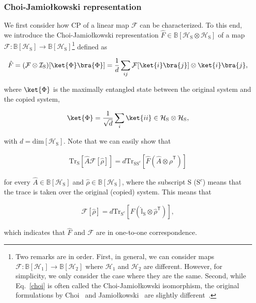 \documentclass[preprint,pteplogo]{ptephy_v2}%
\numberwithin{equation}{section}
\theoremstyle{definition}
\newcommand{\ml}[1]{\mathcal{#1}}
\newcommand{\mr}[1]{\mathrm{#1}}
\newcommand{\mbb}[1]{\mathbb{#1}}
\newcommand{\aln}[1]{
\begin{align}
#1
\end{align}
}
\newcommand{\ra}{\rightarrow}
\newcommand{\Tr}{\mr{Tr}}
\begin{document}
\subsubsection{Choi-Jamiołkowski representation}
We first consider how CP of a linear map $\ml{F}$ can be characterized.
To this end, we introduce the Choi-Jamiołkowski representation $\hat{F}\in\mbb{B}[\ml{H}_\mr{S}\otimes \ml{H}_\mr{S}]$ of a map $\ml{F}: \mbb{B}[\ml{H}_\mr{S}]\ra \mbb{B}[\ml{H}_\mr{S}]$\footnote{
Two remarks are in order. 
First, in general, we can consider maps $\ml{F}: \mbb{B}[\ml{H}_1]\ra \mbb{B}[\ml{H}_2]$ where $\ml{H}_1$ and $\ml{H}_2$ are different. 
However, for simplicity, we only consider the case where they are the same.
Second, while Eq.~\eqref{choi} is often called the Choi-Jamiołkowski isomorphism, the original formulations by Choi~\cite{choi1975completely} and Jamiołkowski~\cite{jamiolkowski1972linear} are slightly different~\cite{jiang2013channel}.
} defined as
\aln{\label{choi}
\hat{F}=(\ml{F}\otimes \ml{I}_\mr{S})[\ket{\Phi}\bra{\Phi}]=\frac{1}{d}\sum_{ij}\ml{F}[\ket{i}\bra{j}]\otimes\ket{i}\bra{j},
}
where $\ket{\Phi}$ is the maximally entangled state between the original system and the copied system,
\aln{
\label{eq:MaximallyEntangledState}
\ket{\Phi}=\frac{1}{\sqrt{d}}\sum_i\ket{ii}\in \ml{H}_\mr{S}\otimes \ml{H}_\mr{S},
}
with $d=\mr{dim}[\ml{H}_\mr{S}]$.
Note that we can easily show that
\aln{
\Tr_\mr{S}[\hat{A}\ml{F}[\hat{\rho}]]=d\Tr_{\mr{SS}^c}[\hat{F}(\hat{A}\otimes\hat{\rho}^\mathsf{T})]
}
for every $\hat{A}\in \mbb{B}[\ml{H}_\mr{S}]$ and $\hat{\rho}\in \mbb{B}[\ml{H}_\mr{S}]$, where the subscript $\mr{S}$ ($\mr{S}^c$) means that the trace is taken over the original (copied) system.
This means that 
\aln{
\ml{F}[\hat{\rho}]=d\Tr_{\mr{S}^c}[\hat{F}(\hat{\mbb{I}}_\mr{S}\otimes\hat{\rho}^\mathsf{T})],
}
which indicates that $\hat{F}$ and $\ml{F}$ are in one-to-one correspondence.
\end{document}
